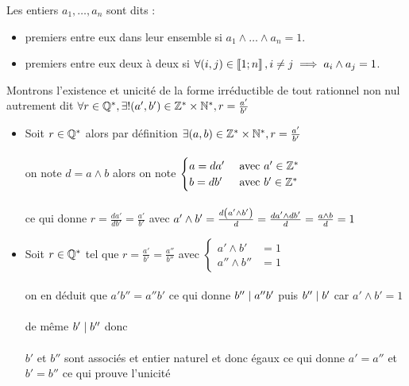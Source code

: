 \begin{defprop}
    Les entiers \(a_1, \dots , a_n\) sont dits :
    \begin{itemize}
        \item premiers entre eux dans leur ensemble si \(a_1 \wedge \dots \wedge a_n = 1\).
        \item premiers entre eux deux à deux si \(\forall (i, j) \in \left\llbracket1;n\right\rrbracket , i \neq j \implies a_i \wedge a_j = 1\).
    \end{itemize}
\end{defprop}
\begin{dem}
    Montrons l'existence et unicité de la forme irréductible de tout rationnel non nul autrement dit \(\forall r \in \mathbb{Q}^*, \exists ! (a',b') \in \mathbb{Z}^* \times \mathbb{N}^*, r = \frac{a'}{b'}\)
    \begin{itemize}
        \item \existence Soit \(r \in \mathbb{Q}^* \) alors par définition \(\exists (a,b) \in \mathbb{Z}^* \times \mathbb{N}^*, r = \frac{a'}{b'}\)\\~\\
        on note \(d = a\wedge b\) alors on note \(\begin{cases}
            a = da' &\text{ avec } a'\in \mathbb{Z}^*\\
            b = db' &\text{ avec } b' \in \mathbb{Z}^*
        \end{cases}\)\\~\\
        ce qui donne \(r = \frac{da'}{db'} = \frac{a'}{b'}\) avec \(a'\wedge b' = \frac{d\left(a'\wedge b'\right)}{d} = \frac{da' \wedge db'}{d} = \frac{a \wedge b}{d} = 1\)
        \item \unicite Soit \(r \in \mathbb{Q}^*\) tel que \(r = \frac{a'}{b'} = \frac{a''}{b''}\) avec \(\begin{cases}
            a'\wedge b' &= 1 \\
            a'' \wedge b'' &= 1
        \end{cases}\)\\~\\
        on en déduit que \(a'b'' = a'' b'\) ce qui donne \(b''\mid a''b'\) puis \(b'' \mid b'\) car \(a'\wedge b' =1\) \\~\\
        de même \(b'\mid b''\) donc \\~\\
        \(b'\) et \(b''\) sont associés et entier naturel et donc égaux ce qui donne \(a' = a''\) et \(b' = b''\) ce qui prouve l'unicité
    \end{itemize}
\end{dem}
